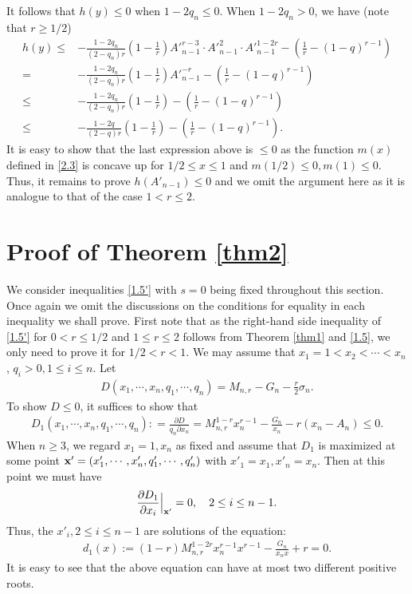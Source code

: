 \documentclass[11pt]{amsart}
\numberwithin{equation}{section}
\theoremstyle{definition}
\theoremstyle{remark}
\begin{document}
  It follows that $h(y) \leq 0$ when $1-2q_n \leq 0$. When $1-2q_n>0$, we have (note that $r \geq 1/2$)
\begin{align*}
   h(y) \leq & -\frac {1-2q_n}{(2-q_n)r}(1-\frac {1}{r}){A'}^{r-3}_{n-1}\cdot {A'}^2_{n-1} \cdot {A'}^{1-2r}_{n-1} -(\frac 1r-(1-q)^{r-1}) \\
=&  -\frac {1-2q_n}{(2-q_n)r}(1-\frac {1}{r}){A'}^{-r}_{n-1}-(\frac 1r-(1-q)^{r-1}) \\
\leq & -\frac {1-2q_n}{(2-q_n)r}(1-\frac {1}{r})-(\frac 1r-(1-q)^{r-1}) \\
\leq & -\frac {1-2q}{(2-q)r}(1-\frac {1}{r})-(\frac 1r-(1-q)^{r-1}).
\end{align*}
   It is easy to show that the last expression above is $\leq 0$ as the function $m(x)$ defined in \eqref{2.3} is concave up for $1/2 \leq x \leq 1$ and $m(1/2) \leq 0, m(1) \leq 0$. Thus, it remains to prove $h(A'_{n-1}) \leq 0$ and we omit the argument here as it is analogue to that of the case $1 < r \leq 2$.

\section{Proof of Theorem \ref{thm2}}
\label{sec 4} \setcounter{equation}{0}

     We consider inequalities \eqref{1.5'} with $s=0$ being fixed throughout this section. Once again we omit the discussions on the conditions for equality in each inequality we shall prove.  First note that as the right-hand side inequality of \eqref{1.5'} for $0<r \leq 1/2$ and $1 \leq r \leq 2$ follows from Theorem \ref{thm1} and \eqref{1.5}, we only need to prove it for $1/2<r<1$.
     We may assume that $x_1=1<x_2<\cdots <x_n$, $q_i>0, 1 \leq i \leq n$. Let
\begin{align*}
   D(x_1, \cdots, x_n, q_1, \cdots, q_n)=M_{n,r}-G_n-\frac r2\sigma_n.
\end{align*}
    To show $D \leq 0$, it suffices to show that
\begin{align*}
   D_1(x_1, \cdots, x_n, q_1, \cdots, q_n): =\frac {\partial D}{q_n\partial x_n}=M^{1-r}_{n,r}x^{r-1}_n-\frac {G_n}{x_n}-r(x_n-A_n) \leq 0.
\end{align*}
   When $n \geq 3$, we regard $x_1=1, x_n$ as fixed and assume that $D_1$ is maximized at some point ${\bf x}'=(x'_1, \cdots, x'_n, q'_1, \cdots, q'_n)$ with $x'_1=x_1, x'_n=x_n$. Then at this point we must have
\begin{align*}
   \frac {\partial D_1}{\partial x_i}\Big |_{{\bf x}'}=0, \quad 2 \leq i \leq n-1.
\end{align*}
   Thus, the $x'_i, 2 \leq i \leq n-1$ are solutions of the equation:
\begin{align*}
   d_1(x):=(1-r)M^{1-2r}_{n,r}x^{r-1}_nx^{r-1}-\frac {G_n}{x_nx}+r=0.
\end{align*}
   It is easy to see that the above equation can have at most two different positive roots.
\end{document}
